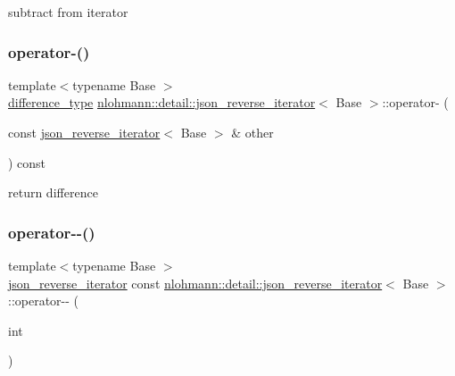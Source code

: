 subtract from iterator 

\mbox{\label{classnlohmann_1_1detail_1_1json__reverse__iterator_aaaa6c0b1d74e74e35e5f7b56dfd6c5d1}} 
\subsubsection{\texorpdfstring{operator-\/()}{operator-()}\hspace{0.1cm}{\footnotesize\ttfamily [2/2]}}
{\footnotesize\ttfamily template$<$typename Base $>$ \\
\mbox{\hyperlink{classnlohmann_1_1detail_1_1json__reverse__iterator_a9ab55987c05ec6427ad36082e351cc45}{difference\+\_\+type}} \mbox{\hyperlink{classnlohmann_1_1detail_1_1json__reverse__iterator}{nlohmann\+::detail\+::json\+\_\+reverse\+\_\+iterator}}$<$ Base $>$\+::operator-\/ (\begin{DoxyParamCaption}\item[{const \mbox{\hyperlink{classnlohmann_1_1detail_1_1json__reverse__iterator}{json\+\_\+reverse\+\_\+iterator}}$<$ Base $>$ \&}]{other }\end{DoxyParamCaption}) const\hspace{0.3cm}{\ttfamily [inline]}}



return difference 

\mbox{\label{classnlohmann_1_1detail_1_1json__reverse__iterator_a2c170f51371538da2c8f4094305da3d3}} 
\subsubsection{\texorpdfstring{operator-\/-\/()}{operator--()}\hspace{0.1cm}{\footnotesize\ttfamily [1/2]}}
{\footnotesize\ttfamily template$<$typename Base $>$ \\
\mbox{\hyperlink{classnlohmann_1_1detail_1_1json__reverse__iterator}{json\+\_\+reverse\+\_\+iterator}} const \mbox{\hyperlink{classnlohmann_1_1detail_1_1json__reverse__iterator}{nlohmann\+::detail\+::json\+\_\+reverse\+\_\+iterator}}$<$ Base $>$\+::operator-\/-\/ (\begin{DoxyParamCaption}\item[{int}]{ }\end{DoxyParamCaption})\hspace{0.3cm}{\ttfamily [inline]}}



